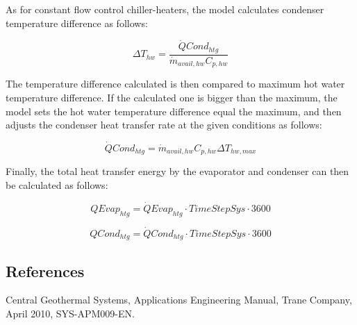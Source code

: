 As for constant flow control chiller-heaters, the model calculates condenser temperature difference as follows:

\begin{equation}
\Delta {T_{hw}} = \frac{{\dot QCon{d_{htg}}}}{{{{\dot m}_{avail,hw}}{C_{p,hw}}}}
\end{equation}

The temperature difference calculated is then compared to maximum hot water temperature difference. If the calculated one is bigger than the maximum, the model sets the hot water temperature difference equal the maximum, and then adjusts the condenser heat transfer rate at the given conditions as follows:

\begin{equation}
\dot QCon{d_{htg}} = {\dot m_{avail,hw}}{C_{p,hw}}\Delta {T_{hw,max}}
\end{equation}

Finally, the total heat transfer energy by the evaporator and condenser can then be calculated as follows:

\begin{equation}
QEva{p_{htg}} = \dot QEva{p_{htg}} \cdot TimeStepSys \cdot 3600
\end{equation}

\begin{equation}
QCon{d_{htg}} = \dot QCon{d_{htg}} \cdot TimeStepSys \cdot 3600
\end{equation}

\subsection{References}\label{references-008}

Central Geothermal Systems, Applications Engineering Manual, Trane Company, April 2010, SYS-APM009-EN.
